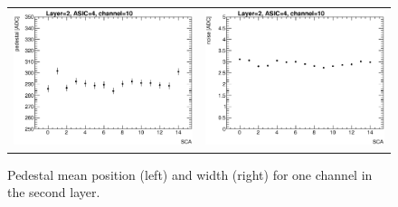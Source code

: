 \documentclass[a4paper,11pt]{article}
\begin{document}
\begin{figure}[!t]
  \centering
  \begin{tabular}{ll}
    \includegraphics[width=2.8in]{figs/pedestal/ped_mean_layer2_chip4_cell10.eps} & \includegraphics[width=2.8in]{figs/pedestal/ped_width_layer2_chip4_cell10.eps}
  \end{tabular}
  \caption{Pedestal mean position (left) and width (right) for one channel in the second layer.}
\label{pedestal_channel}
\end{figure}
\end{document}
